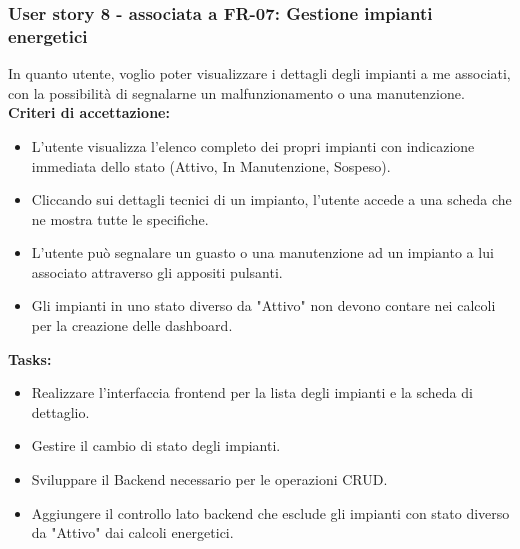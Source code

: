 \subsubsection*{User story 8 - associata a FR-07: Gestione impianti energetici}
In quanto utente, voglio poter visualizzare i dettagli degli impianti a me associati, con la possibilità di segnalarne un malfunzionamento o una manutenzione.
\textbf{Criteri di accettazione:}
\begin{itemize}
    \item L'utente visualizza l'elenco completo dei propri impianti con indicazione immediata dello stato (Attivo, In Manutenzione, Sospeso).
    \item Cliccando sui dettagli tecnici di un impianto, l'utente accede a una scheda che ne mostra tutte le specifiche.
    \item L'utente può segnalare un guasto o una manutenzione ad un impianto a lui associato attraverso gli appositi pulsanti.
    \item Gli impianti in uno stato diverso da "Attivo" non devono contare nei calcoli per la creazione delle dashboard.
\end{itemize}
\textbf{Tasks:}
\begin{itemize}
    \item Realizzare l'interfaccia frontend per la lista degli impianti e la scheda di dettaglio.
    \item Gestire il cambio di stato degli impianti.
    \item Sviluppare il Backend necessario per le operazioni CRUD.
    \item Aggiungere il controllo lato backend che esclude gli impianti con stato diverso da "Attivo" dai calcoli energetici.
\end{itemize}
